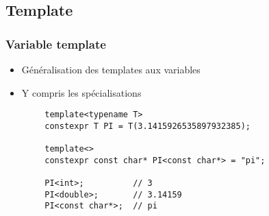 \documentclass[C++.tex]{subfiles}
\begin{document}
\subsection*{Template}
\begin{frame}[fragile]
	\frametitle{Variable template}
	\begin{itemize}
		\item Généralisation des templates aux variables
		\item Y compris les spécialisations
	\end{itemize}

	\begin{verbatim}
		template<typename T>
		constexpr T PI = T(3.1415926535897932385);

		template<>
		constexpr const char* PI<const char*> = "pi";

		PI<int>;          // 3
		PI<double>;       // 3.14159
		PI<const char*>;  // pi
	\end{verbatim}


\end{frame}
\end{document}
